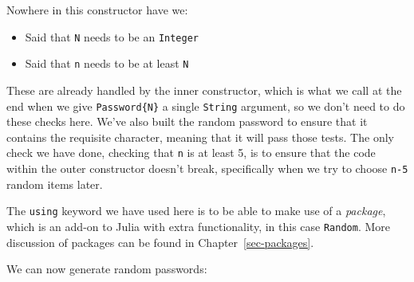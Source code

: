 \documentclass[
  letterpaper,
  DIV=11,
  numbers=noendperiod]{scrreprt}
\begin{document}
\begin{tcolorbox}[enhanced jigsaw, toprule=.15mm, opacitybacktitle=0.6, leftrule=.75mm, breakable, coltitle=black, bottomrule=.15mm, colbacktitle=quarto-callout-note-color!10!white, bottomtitle=1mm, rightrule=.15mm, title=\textcolor{quarto-callout-note-color}{\faInfo}\hspace{0.5em}{Note}, colframe=quarto-callout-note-color-frame, left=2mm, colback=white, opacityback=0, arc=.35mm, toptitle=1mm, titlerule=0mm]

Nowhere in this constructor have we:

\begin{itemize}
\item
  Said that \texttt{N} needs to be an \texttt{Integer}
\item
  Said that \texttt{n} needs to be at least \texttt{N}
\end{itemize}

These are already handled by the inner constructor, which is what we
call at the end when we give \texttt{Password\{N\}} a single
\texttt{String} argument, so we don't need to do these checks here.
We've also built the random password to ensure that it contains the
requisite character, meaning that it will pass those tests. The only
check we have done, checking that \texttt{n} is at least 5, is to ensure
that the code within the outer constructor doesn't break, specifically
when we try to choose \texttt{n-5} random items later.

\end{tcolorbox}

\begin{tcolorbox}[enhanced jigsaw, toprule=.15mm, opacitybacktitle=0.6, leftrule=.75mm, breakable, coltitle=black, bottomrule=.15mm, colbacktitle=quarto-callout-note-color!10!white, bottomtitle=1mm, rightrule=.15mm, title=\textcolor{quarto-callout-note-color}{\faInfo}\hspace{0.5em}{Note}, colframe=quarto-callout-note-color-frame, left=2mm, colback=white, opacityback=0, arc=.35mm, toptitle=1mm, titlerule=0mm]

The \texttt{using} keyword we have used here is to be able to make use
of a \emph{package}, which is an add-on to Julia with extra
functionality, in this case \texttt{Random}. More discussion of packages
can be found in Chapter~\ref{sec-packages}.

\end{tcolorbox}

We can now generate random passwords:
\end{document}
